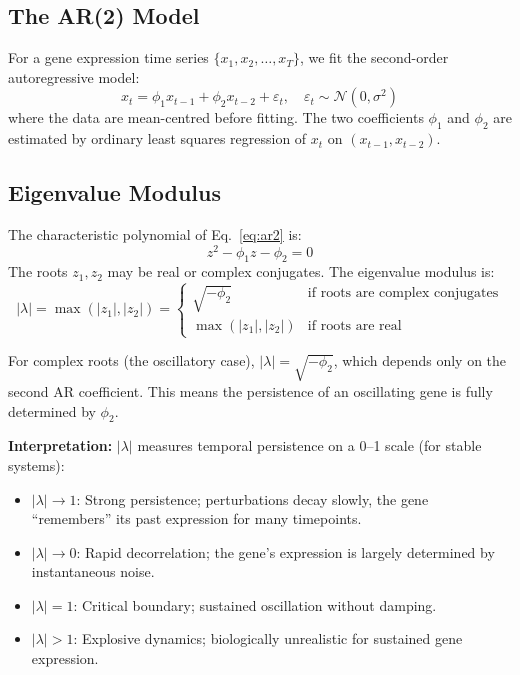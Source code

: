 \documentclass[11pt,letterpaper]{article}
\begin{document}
\subsection{The AR(2) Model}

For a gene expression time series $\{x_1, x_2, \ldots, x_T\}$, we fit the second-order autoregressive model:
\begin{equation}
x_t = \phi_1 x_{t-1} + \phi_2 x_{t-2} + \varepsilon_t, \quad \varepsilon_t \sim \mathcal{N}(0, \sigma^2)
\label{eq:ar2}
\end{equation}
where the data are mean-centred before fitting. The two coefficients $\phi_1$ and $\phi_2$ are estimated by ordinary least squares regression of $x_t$ on $(x_{t-1}, x_{t-2})$.

\subsection{Eigenvalue Modulus}

The characteristic polynomial of Eq.~\ref{eq:ar2} is:
\begin{equation}
z^2 - \phi_1 z - \phi_2 = 0
\label{eq:charpoly}
\end{equation}
The roots $z_1, z_2$ may be real or complex conjugates. The eigenvalue modulus is:
\begin{equation}
|\lambda| = \max(|z_1|, |z_2|) = \begin{cases}
\sqrt{-\phi_2} & \text{if roots are complex conjugates} \\
\max(|z_1|, |z_2|) & \text{if roots are real}
\end{cases}
\end{equation}

For complex roots (the oscillatory case), $|\lambda| = \sqrt{-\phi_2}$, which depends only on the second AR coefficient. This means the persistence of an oscillating gene is fully determined by $\phi_2$.

\textbf{Interpretation:} $|\lambda|$ measures temporal persistence on a 0--1 scale (for stable systems):
\begin{itemize}
\item $|\lambda| \to 1$: Strong persistence; perturbations decay slowly, the gene ``remembers'' its past expression for many timepoints.
\item $|\lambda| \to 0$: Rapid decorrelation; the gene's expression is largely determined by instantaneous noise.
\item $|\lambda| = 1$: Critical boundary; sustained oscillation without damping.
\item $|\lambda| > 1$: Explosive dynamics; biologically unrealistic for sustained gene expression.
\end{itemize}
\end{document}
